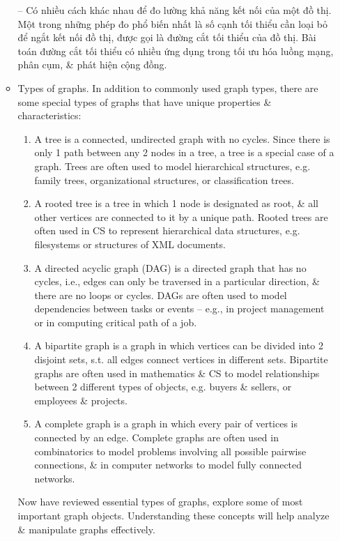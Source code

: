 \documentclass{article}
\begin{document}
\begin{itemize}
\begin{itemize}
        -- Có nhiều cách khác nhau để đo lường khả năng kết nối của một đồ thị. Một trong những phép đo phổ biến nhất là số cạnh tối thiểu cần loại bỏ để ngắt kết nối đồ thị, được gọi là đường cắt tối thiểu của đồ thị. Bài toán đường cắt tối thiểu có nhiều ứng dụng trong tối ưu hóa luồng mạng, phân cụm, \& phát hiện cộng đồng.
        \item {\sf Types of graphs.} In addition to commonly used graph types, there are some special types of graphs that have unique properties \& characteristics:
        \begin{enumerate}
            \item A tree is a connected, undirected graph with no cycles. Since there is only 1 path between any 2 nodes in a tree, a tree is a special case of a graph. Trees are often used to model hierarchical structures, e.g. family trees, organizational structures, or classification trees.
            \item A rooted tree is a tree in which 1 node is designated as root, \& all other vertices are connected to it by a unique path. Rooted trees are often used in CS to represent hierarchical data structures, e.g. filesystems or structures of XML documents.
            \item A directed acyclic graph (DAG) is a directed graph that has no cycles, i.e., edges can only be traversed in a particular direction, \& there are no loops or cycles. DAGs are often used to model dependencies between tasks or events -- e.g., in project management or in computing critical path of a job.
            \item A bipartite graph is a graph in which vertices can be divided into 2 disjoint sets, s.t. all edges connect vertices in different sets. Bipartite graphs are often used in mathematics \& CS to model relationships between 2 different types of objects, e.g. buyers \& sellers, or employees \& projects.
            \item A complete graph is a graph in which every pair of vertices is connected by an edge. Complete graphs are often used in combinatorics to model problems involving all possible pairwise connections, \& in computer networks to model fully connected networks.
        \end{enumerate}
        Now have reviewed essential types of graphs, explore some of most important graph objects. Understanding these concepts will help analyze \& manipulate graphs effectively.


\end{itemize}
\end{itemize}
\end{document}
